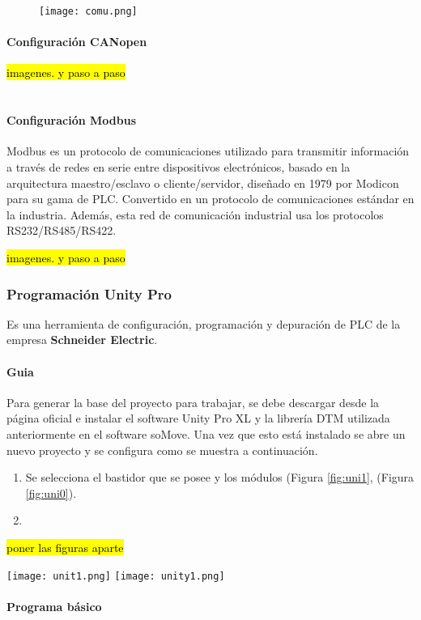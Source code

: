 \begin{figure}[htb]
	\centering
	\texttt{[image: comu.png]}
\end{figure}


\paragraph{Configuración CANopen}

\hl{imagenes. y paso a paso}\\
\\

\paragraph{Configuración Modbus}
\begin{tcolorbox}[colback=blue!5!white,colframe=blue!75!black,title=ModBus]
	Modbus es un protocolo de comunicaciones utilizado para transmitir información a través de redes en serie entre dispositivos electrónicos, basado en la arquitectura maestro/esclavo o cliente/servidor, diseñado en 1979 por Modicon para su gama de PLC. Convertido en un protocolo de comunicaciones estándar en la industria. Además, esta red de comunicación industrial usa los protocolos RS232/RS485/RS422.
\end{tcolorbox}
\hl{imagenes. y paso a paso}

\subsubsection{Programación Unity Pro}
\begin{tcolorbox}[colback=blue!5!white,colframe=blue!75!black,title=Definición]
	Es una herramienta de configuración, programación y depuración de PLC de la empresa \textbf{Schneider Electric}.
\end{tcolorbox}

\paragraph{Guia}
Para generar la base del proyecto para trabajar, se debe descargar desde la página oficial e instalar el software Unity Pro XL y la librería DTM utilizada anteriormente en el software soMove. Una vez que esto está instalado se abre un nuevo proyecto y se configura como se muestra a continuación.
\begin{enumerate}
	\item Se selecciona el bastidor que se posee y los módulos (Figura \ref{fig:uni1}, (Figura \ref{fig:uni0}).
	
	\item 
  \end{enumerate}
\hl{poner las figuras aparte}
	\begin{center}
		\texttt{[image: unit1.png]}
	\label{fig:uni1}
		\texttt{[image: unity1.png]}
	\label{fig:uni0}
	\end{center}
	
	


\paragraph{Programa básico}
\newpage

